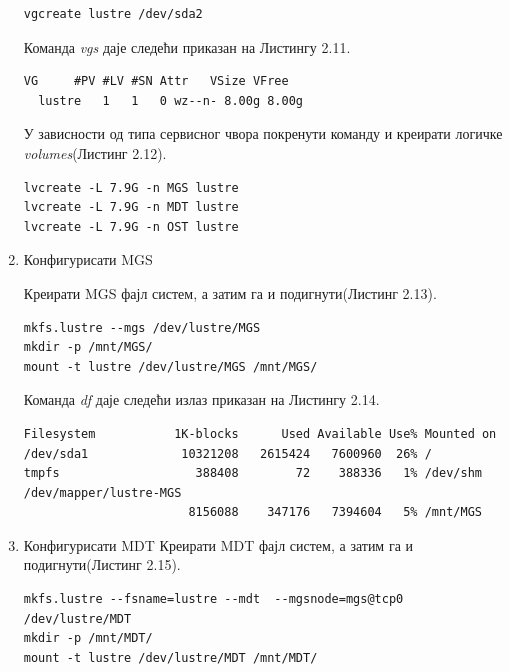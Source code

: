 \begin{enumerate}
\begin{verbatim}
vgcreate lustre /dev/sda2
\end{verbatim}

Команда \textit{vgs} даје следећи приказан на Листингу 2.11.

\begin{lstlisting}[style=nonumbers,frame=single, caption=Излаз команде \textit{vgs}]
  VG     #PV #LV #SN Attr   VSize VFree 
  lustre   1   1   0 wz--n- 8.00g 8.00g
\end{lstlisting}

У зависности од типа сервисног чвора покренути команду и креирати логичке \textit{volumes}(Листинг 2.12).

\begin{lstlisting}[style=nonumbers,frame=single, caption=Креирање логичких \textit{volumes}]
lvcreate -L 7.9G -n MGS lustre
lvcreate -L 7.9G -n MDT lustre
lvcreate -L 7.9G -n OST lustre
\end{lstlisting}


\item Конфигурисати MGS

Креирати MGS фајл систем, а затим га и подигнути(Листинг 2.13).
\begin{lstlisting}[style=nonumbers,frame=single, caption=Креирање MGS фајл систем]
mkfs.lustre --mgs /dev/lustre/MGS
mkdir -p /mnt/MGS/
mount -t lustre /dev/lustre/MGS /mnt/MGS/ 
\end{lstlisting}


Команда  \textit{df} даје следећи излаз приказан на Листингу 2.14.
\begin{lstlisting}[style=nonumbers,frame=single, caption= Излаз \textit{df} команде]
Filesystem           1K-blocks      Used Available Use% Mounted on
/dev/sda1             10321208   2615424   7600960  26% /
tmpfs                   388408        72    388336   1% /dev/shm
/dev/mapper/lustre-MGS
                       8156088    347176   7394604   5% /mnt/MGS
\end{lstlisting}


\item Конфигурисати MDT 
Креирати MDT фајл систем, а затим га и подигнути(Листинг 2.15).

\begin{lstlisting}[style=nonumbers,frame=single, caption=Креирање MDT фајл систем]
mkfs.lustre --fsname=lustre --mdt  --mgsnode=mgs@tcp0 /dev/lustre/MDT 
mkdir -p /mnt/MDT/
mount -t lustre /dev/lustre/MDT /mnt/MDT/ 
\end{lstlisting}



\end{enumerate}
